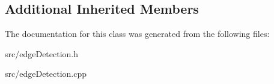 \subsection*{Additional Inherited Members}


The documentation for this class was generated from the following files\+:\begin{DoxyCompactItemize}
\item 
src/edge\+Detection.\+h\item 
src/edge\+Detection.\+cpp\end{DoxyCompactItemize}
